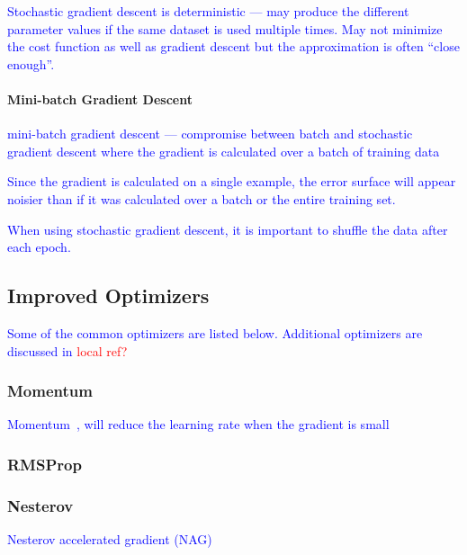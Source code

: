 \textcolor{blue}{Stochastic gradient descent is deterministic --- may produce the different parameter values if the same dataset is used multiple times. May not minimize the cost function as well as gradient descent but the approximation is often ``close enough''.}


\paragraph{Mini-batch Gradient Descent}

\textcolor{blue}{mini-batch gradient descent --- compromise between batch and stochastic gradient descent where the gradient is calculated over a batch of training data}

\textcolor{blue}{Since the gradient is calculated on a single example, the error surface will appear noisier than if it was calculated over a batch or the entire training set.}

\textcolor{blue}{When using stochastic gradient descent, it is important to shuffle the data after each epoch.}



\subsection{Improved Optimizers}

\textcolor{blue}{Some of the common optimizers are listed below. Additional optimizers are discussed in \textcolor{red}{local ref?}}

\subsubsection{Momentum}

\textcolor{blue}{Momentum~\cite{qian1999momentum}, will reduce the learning rate when the gradient is small}

\subsubsection{RMSProp}

\subsubsection{Nesterov}

\textcolor{blue}{Nesterov accelerated gradient (NAG)}

